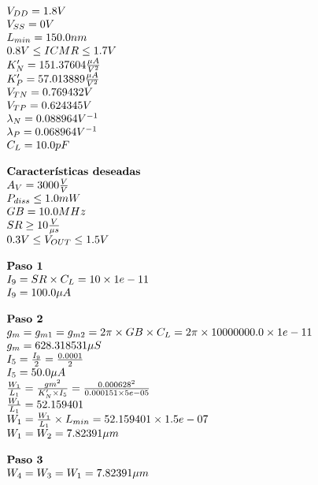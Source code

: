 \begin{equation*}
	\begin{array}{l l}
		V_{DD} =  1.8  V \\
		V_{SS} =  0  V \\
		L_{min} =  150.0  nm \\
		0.8 V \leq ICMR \leq 1.7 V \\
		K'_{N} =  151.37604  \frac{\mu A}{V^{2}} \\
		K'_{P} =  57.013889  \frac{\mu A}{V^{2}} \\
		V_{TN} =  0.769432  V \\
		V_{TP} =  0.624345  V \\
		\lambda_{N} =  0.088964  V^{-1} \\
		\lambda_{P} =  0.068964  V^{-1} \\
		C_{L} =  10.0  pF \\
		\\
		\textbf{Características deseadas} \\
		A_{V} =  3000  \frac{V}{V} \\
		P_{diss} \leq  1.0  mW \\
		GB =  10.0  MHz \\
		SR \geq  10  \frac{V}{\mu s} \\
		0.3 V \leq V_{OUT} \leq 1.5 V \\
		\\
		\textbf{Paso 1} \\
		I_{9} = SR \times C_{L} = 10\times1e-11 \\
		I_{9} =  100.0 \mu A \\
		\\
		\textbf{Paso 2} \\
		g_{m} = g_{m1} = g_{m2} = 2\pi{} \times GB \times C_{L} = 2 \pi{} \times10000000.0\times 1e-11  \\
		g_{m} =  628.318531  \mu S \\
		I_{5} = \frac{I_{9}}{2} = \frac{ 0.0001 }{2} \\
		I_{5} =  50.0 \mu A \\
		\frac{W_1}{L_1} = \frac{gm^2}{K'_{N}\times I_5} = \frac{0.000628^2}{0.000151\times5e-05}\\
		\frac{W_1}{L_1} =  52.159401  \\
		W_{1} = \frac{W_1}{L_1} \times L_{min} =  52.159401 \times 1.5e-07  \\
		W_{1} = W_{2} =  7.82391  \mu m \\
		\\
		\textbf{Paso 3} \\
		W_{4} = W_{3} = W_{1} =  7.82391  \mu m \\
	\end{array}
\end{equation*}

